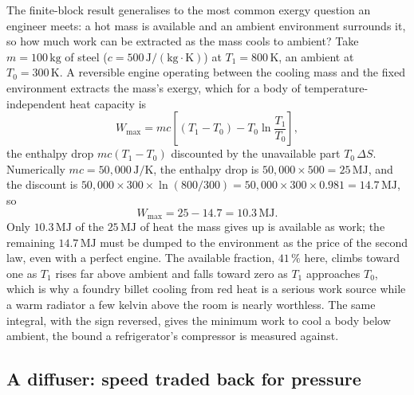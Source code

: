 The finite-block result generalises to the most common exergy question an engineer
meets: a hot mass is available and an ambient environment surrounds it, so how much
work can be extracted as the mass cools to ambient? Take $m = 100\,\text{kg}$ of
steel ($c = 500\,\text{J}/(\text{kg}\cdot\si{\kelvin})$) at $T_1 =
800\,\si{\kelvin}$, an ambient at $T_0 = 300\,\si{\kelvin}$. A reversible engine
operating between the cooling mass and the fixed environment extracts the mass's
exergy, which for a body of temperature-independent heat capacity is
\[
W_{\max} = mc\!\left[(T_1 - T_0) - T_0\ln\frac{T_1}{T_0}\right],
\]
the enthalpy drop $mc(T_1 - T_0)$ discounted by the unavailable part
$T_0\,\Delta S$. Numerically $mc = 50{,}000\,\text{J}/\si{\kelvin}$, the enthalpy
drop is $50{,}000 \times 500 = 25\,\text{MJ}$, and the discount is $50{,}000 \times
300 \times \ln(800/300) = 50{,}000 \times 300 \times 0.981 = 14.7\,\text{MJ}$, so
\[
W_{\max} = 25 - 14.7 = 10.3\,\text{MJ}.
\]
Only $10.3\,\text{MJ}$ of the $25\,\text{MJ}$ of heat the mass gives up is
available as work; the remaining $14.7\,\text{MJ}$ must be dumped to the
environment as the price of the second law, even with a perfect engine. The
available fraction, $41\,\%$ here, climbs toward one as $T_1$ rises far above
ambient and falls toward zero as $T_1$ approaches $T_0$, which is why a
foundry billet cooling from red heat is a serious work source while a warm radiator
a few kelvin above the room is nearly worthless. The same integral, with the sign
reversed, gives the minimum work to cool a body below ambient, the bound a
refrigerator's compressor is measured against.

\subsection{A diffuser: speed traded back for pressure}

